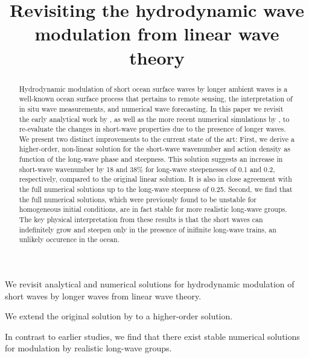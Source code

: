\documentclass[draft]{agujournal2019}
\begin{document}
\title{Revisiting the hydrodynamic wave modulation from linear wave theory}




\begin{keypoints}
\item We revisit analytical and numerical solutions for hydrodynamic modulation of short waves by longer waves from linear wave theory.
\item We extend the original solution by  to a higher-order solution.
\item In contrast to earlier studies, we find that there exist stable numerical solutions for modulation by realistic long-wave groups.
\end{keypoints}

\begin{abstract}
Hydrodynamic modulation of short ocean surface waves by longer ambient waves is
a well-known ocean surface process that pertains to remote sensing, the
interpretation of in situ wave measurements, and numerical wave forecasting.
In this paper we revisit the early analytical work by ,
as well as the more recent numerical simulations by ,
to re-evaluate the changes in short-wave properties due to the presence of longer waves.
We present two distinct improvements to the current state of the art:
First, we derive a higher-order, non-linear solution for the short-wave wavenumber
and action density as function of the long-wave phase and steepness.
This solution suggests an increase in short-wave wavenumber by 18 and 38\% for
long-wave steepenesses of 0.1 and 0.2, respectively, compared to the original
linear solution.
It is also in close agreement with the full numerical solutions up to the
long-wave steepness of 0.25.
Second, we find that the full numerical solutions, which were previously found
to be unstable for homogeneous initial conditions, are in fact stable for more
realistic long-wave groups.
The key physical interpretation from these results is that the short waves can
indefinitely grow and steepen only in the presence of inifinite long-wave trains,
an unlikely occurence in the ocean.
\end{abstract}
\end{document}

